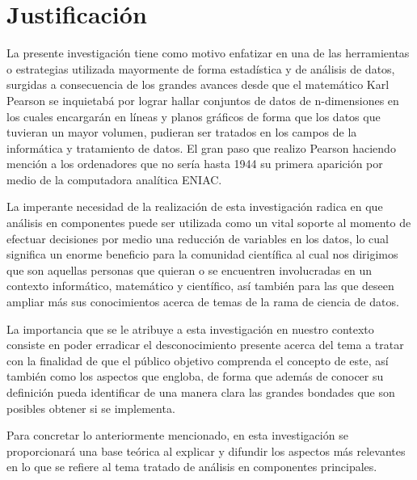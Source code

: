 \chapter{Justificación}

La presente investigación tiene como motivo enfatizar en una de las herramientas o estrategias utilizada mayormente de forma estadística y de análisis de datos, surgidas a consecuencia de los grandes avances desde que el matemático Karl Pearson se inquietabá por lograr hallar conjuntos de datos de n-dimensiones en los cuales encargarán en líneas y planos gráficos de forma que los datos que tuvieran un mayor volumen, pudieran ser tratados en los campos de la informática y tratamiento de datos. El gran paso que realizo Pearson haciendo mención a los ordenadores que no sería hasta 1944 su primera aparición por medio de la computadora analítica ENIAC. 

La imperante necesidad de la realización de esta investigación radica en que análisis en componentes puede ser utilizada como un vital soporte al momento de efectuar decisiones por medio una reducción de variables en los datos, lo cual significa un enorme beneficio para la comunidad científica al cual nos dirigimos que son aquellas personas que quieran o se encuentren involucradas en un contexto informático, matemático y científico, así también para las que deseen ampliar más sus conocimientos acerca de temas de la rama de ciencia de datos.

La importancia que se le atribuye a esta investigación en nuestro contexto consiste en poder erradicar el desconocimiento presente acerca del tema a tratar con la finalidad de que el público objetivo comprenda el concepto de este, así también como los aspectos que engloba, de forma que además de conocer su definición pueda identificar de una manera clara las grandes bondades que son posibles obtener si se implementa. 

Para concretar lo anteriormente mencionado, en esta investigación se proporcionará una base teórica al explicar y difundir los aspectos más relevantes en lo que se refiere al tema tratado de análisis en componentes principales.
